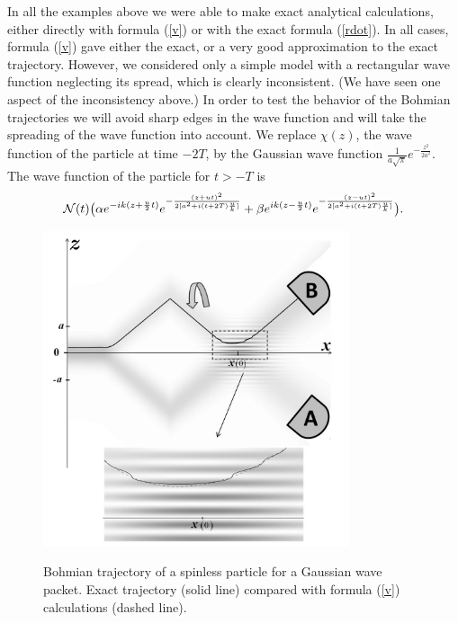 \documentclass[12pt,preprint,tightenlines]{elsarticle}
\begin{document}
In all the examples above we were able to make exact analytical calculations,
either directly with formula (\ref{v}) or with the exact formula
(\ref{rdot}). In all cases, formula (\ref{v}) gave either the exact,
or a very good approximation to the exact trajectory. However, we considered
only a simple model with a rectangular wave function neglecting its
spread, which is clearly inconsistent. (We have seen one aspect of
the inconsistency above.) In order to test the behavior of the Bohmian
trajectories we will avoid sharp edges in the wave function and will
take the spreading of the wave function into account. We replace $\chi(z)$,
the wave function of the particle at time $-2T$, by the Gaussian
wave function $\frac{1}{a\sqrt{\pi}}e^{-\frac{z^{2}}{2a^{2}}}$. The wave function
of the particle for $t>-T$ is
\begin{equation}
{\cal N}(t)\big(\alpha e^{-ik(z+\frac{u}{2}t)}e^{-\frac{(z+ut)^{2}}{2[a^{2}+i(t+2T)\frac{u}{k}]}}+\beta e^{ik(z-\frac{u}{2}t)}e^{-\frac{(z-ut)^{2}}{2[a^{2}+i(t+2T)\frac{u}{k}]}}\big).\label{gaus}
\end{equation}


\begin{figure}[H]\vspace{-20pt}
  \includegraphics[width=9cm]{10.pdf}\\\vspace{-9pt}
      \caption{ Bohmian trajectory of a  spinless particle for a Gaussian wave packet. Exact trajectory (solid line) compared with formula (\ref{v}) calculations (dashed line).}
\end{figure}
\end{document}
